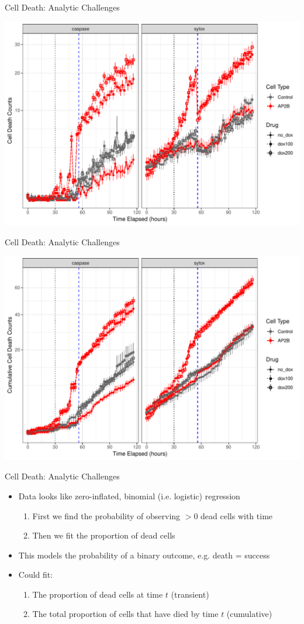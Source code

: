 \documentclass[11pt]{beamer}
\begin{document}
\begin{frame}{Cell Death: Analytic Challenges}

	\center
	\includegraphics[width=0.75\linewidth]{figures/DeathCounts.pdf} 

\end{frame}

\begin{frame}{Cell Death: Analytic Challenges}

	\center
	\includegraphics[width=0.75\linewidth]{figures/CumulativeDeathCounts.pdf} 

\end{frame}

\begin{frame}{Cell Death: Analytic Challenges}

	\begin{itemize}
		\item Data looks like zero-inflated, binomial (i.e. logistic) regression
		\begin{enumerate}
			\item First we find the probability of observing $>0$ dead cells with time
			\item Then we fit the proportion of dead cells 
		\end{enumerate}
		\item This models the probability of a binary outcome, e.g. death = success
		\item Could fit:
		\begin{enumerate}
			\item The proportion of dead cells at time $t$ (transient)
			\item The total proportion of cells that have died by time $t$ (cumulative)
		\end{enumerate}
	\end{itemize}
	
\end{frame}
\end{document}
